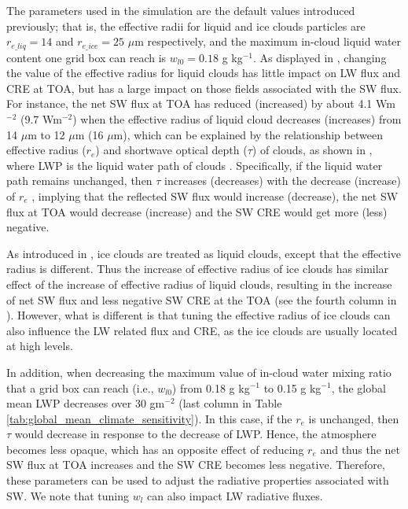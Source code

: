 The parameters used in the simulation are the default values introduced previously; that is, the effective radii for liquid and ice clouds particles are $r_{e\_liq}=14$ and $r_{e\_ice}=25$ $\mu$m respectively, and the maximum in-cloud liquid water content one grid box can reach is $w_{l0}=0.18$ g kg$^{-1}$. As displayed in , changing the value of the effective radius for liquid clouds has little impact on LW flux and CRE at TOA, but has a large impact on those fields associated with the SW flux. For instance, the net SW flux at TOA has reduced (increased) by about 4.1 Wm$^{-2}$ (9.7 Wm$^{-2}$) when the effective radius of liquid cloud decreases (increases) from 14 $\mu$m to 12 $\mu$m (16 $\mu$m), which can be explained by the relationship between effective radius ($r_e$) and shortwave optical depth ($\tau$) of clouds, as shown in , where LWP is the liquid water path of clouds \citep{Stephens1978radiation,Morcrette1986}. Specifically, if the liquid water path remains unchanged, then $\tau$ increases (decreases) with the decrease (increase) of $r_e$ \citep[e.g.,][]{Slingo1982}, implying that the reflected SW flux would increase (decrease), the net SW flux at TOA would decrease (increase) and the SW CRE would get more (less) negative. 

As introduced in , ice clouds are treated as liquid clouds, except that the effective radius is different. Thus the increase of effective radius of ice clouds has similar effect of the increase of effective radius of liquid clouds, resulting in the increase of net SW flux and less negative SW CRE at the TOA (see the fourth column in ). However, what is different is that tuning the effective radius of ice clouds can also influence the LW related flux and CRE, as the ice clouds are usually located at high levels.

In addition, when decreasing the maximum value of in-cloud water mixing ratio that a grid box can reach (i.e., $w_{l0}$) from 0.18 g kg$^{-1}$ to 0.15 g kg$^{-1}$, the global mean LWP decreases over 30 gm$^{-2}$ (last column in Table \ref{tab:global_mean_climate_sensitivity}). In this case, if the $r_e$ is unchanged, then $\tau$ would decrease in response to the decrease of LWP. Hence, the atmosphere becomes less opaque, which has an opposite effect of reducing $r_e$ and thus the net SW flux at TOA increases and the SW CRE becomes less negative. Therefore, these parameters can be used to adjust the radiative properties associated with SW. We note that tuning $w_l$ can also impact LW radiative fluxes.

